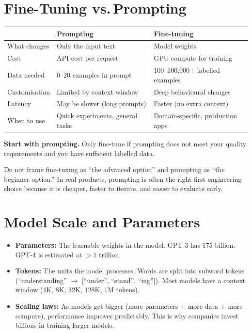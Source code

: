 \documentclass[12pt, a4paper, oneside]{book}
\begin{document}
\section{Fine-Tuning vs.\,Prompting}

\begin{center}
\begin{tabular}{l l l}
\toprule
& \textbf{Prompting} & \textbf{Fine-tuning} \\
\midrule
What changes & Only the input text & Model weights \\
Cost & API cost per request & GPU compute for training \\
Data needed & 0--20 examples in prompt & 100--100,000+ labelled examples \\
Customisation & Limited by context window & Deep behavioural changes \\
Latency & May be slower (long prompts) & Faster (no extra context) \\
When to use & Quick experiments, general tasks & Domain-specific, production apps \\
\bottomrule
\end{tabular}
\end{center}

\textbf{Start with prompting.} Only fine-tune if prompting does not meet your quality requirements and you have sufficient labelled data.

\begin{warningbox}
Do not frame fine-tuning as ``the advanced option'' and prompting as ``the beginner option.'' In real products, prompting is often the right first engineering choice because it is cheaper, faster to iterate, and easier to evaluate early.
\end{warningbox}

\section{Model Scale and Parameters}

\begin{itemize}[leftmargin=2em]
    \item \textbf{Parameters:} The learnable weights in the model. GPT-3 has 175 billion. GPT-4 is estimated at $> 1$ trillion.
    \item \textbf{Tokens:} The units the model processes. Words are split into subword tokens (``understanding'' $\to$ [``under'', ``stand'', ``ing'']). Most models have a context window (4K, 8K, 32K, 128K, 1M tokens).
    \item \textbf{Scaling laws:} As models get bigger (more parameters + more data + more compute), performance improves predictably. This is why companies invest billions in training larger models.
\end{itemize}
\end{document}
